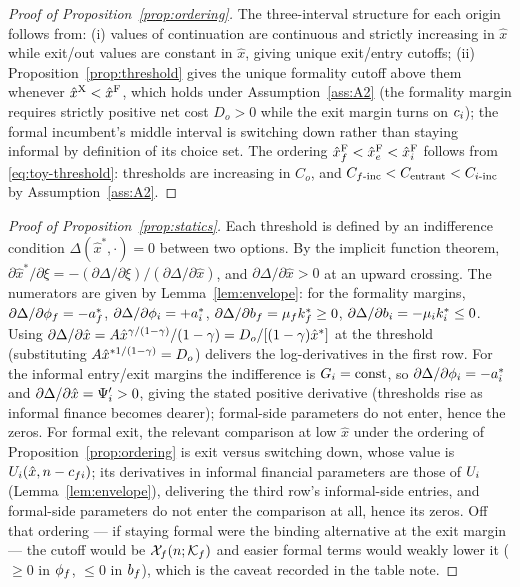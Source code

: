 \documentclass[12pt]{article}
\begin{document}
\begin{proof}[Proof of Proposition~\ref{prop:ordering}]
The three-interval structure for each origin follows from: (i) values
of continuation are continuous and strictly increasing in $\hat x$
while exit/out values are constant in $\hat x$, giving unique
exit/entry cutoffs; (ii) Proposition~\ref{prop:threshold} gives the
unique formality cutoff above them whenever
$\hat{x}^{\mathrm{X}}_{}<\hat{x}^{\mathrm{F}}_{}$, which holds under Assumption~\ref{ass:A2} (the
formality margin requires strictly positive net cost $D_{o}>0$ while
the exit margin turns on $c_{i}$); the formal incumbent's middle
interval is switching down rather than staying informal by
definition of its choice set. The ordering
$\hat{x}^{\mathrm{F}}_{f}<\hat{x}^{\mathrm{F}}_{e}<\hat{x}^{\mathrm{F}}_{i}$ follows from
\eqref{eq:toy-threshold}: thresholds are increasing in $C_{o}$, and
$C_{f\text{-inc}}<C_{\text{entrant}}<C_{i\text{-inc}}$ by
Assumption~\ref{ass:A2}.
\end{proof}
 
\begin{proof}[Proof of Proposition~\ref{prop:statics}]
Each threshold is defined by an indifference condition
$\Delta(\hat x^{*},\cdot)=0$ between two options. By the implicit
function theorem,
$\partial\hat x^{*}/\partial\xi
=-(\partial\Delta/\partial\xi)/(\partial\Delta/\partial\hat x)$,
and $\partial\Delta/\partial\hat x>0$ at an upward crossing. The
numerators are given by Lemma~\ref{lem:envelope}: for the formality
margins, $\partial\Delta/\partial\phi_{f}=-a^{*}_{f}$,
$\partial\Delta/\partial\phi_{i}=+a^{*}_{i}$,
$\partial\Delta/\partial b_{f}=\mu_{f}k^{*}_{f}\geq0$,
$\partial\Delta/\partial b_{i}=-\mu_{i}k^{*}_{i}
\leq0$. Using
$\partial\Delta/\partial\hat x
=A\hat x^{\gamma/(1-\gamma)}/(1-\gamma)
=D_{o}/[(1-\gamma)\hat x^{*}]$ at the threshold (substituting
$A\hat x^{*1/(1-\gamma)}=D_{o}$) delivers the log-derivatives in the
first row. For the informal entry/exit margins the indifference is
$G_{i}=\text{const}$, so
$\partial\Delta/\partial\phi_{i}=-a^{*}_{i}$ and
$\partial\Delta/\partial\hat x=\Psi'_{i}>0$, giving the stated
positive derivative (thresholds rise as informal finance becomes
dearer); formal-side parameters do not enter, hence the zeros. For
formal exit, the relevant comparison at low $\hat x$ under the
ordering of Proposition~\ref{prop:ordering} is exit versus switching
down, whose value is
$U_{i}(\hat x,n-c_{fi})$; its derivatives in
informal financial parameters are those of $U_{i}$
(Lemma~\ref{lem:envelope}), delivering the third row's informal-side
entries, and formal-side parameters do not enter the comparison at
all, hence its zeros. Off that ordering --- if staying formal were the
binding alternative at the exit margin --- the cutoff would be
$\mathcal{X}_{f}(n;\mathcal{K}_{f})$ and easier formal terms would weakly
lower it ($\geq0$ in $\phi_{f}$, $\leq0$ in $b_{f}$),
which is the caveat recorded in the table note.
\end{proof}
 
\end{document}
